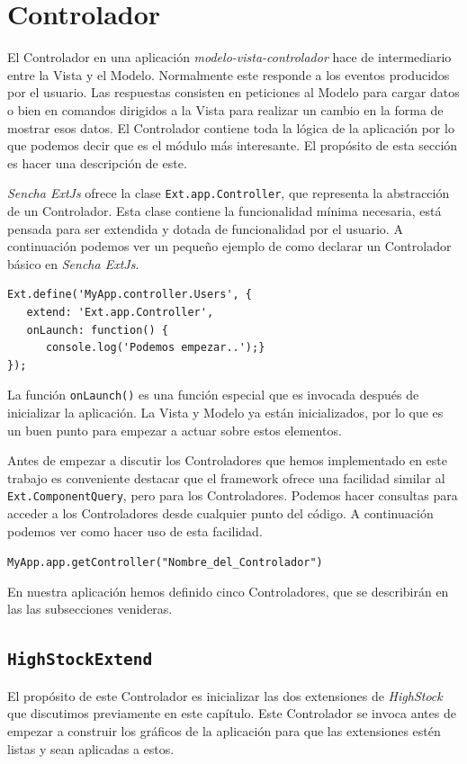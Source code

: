 \section{Controlador}
	El Controlador en una aplicación \emph{modelo-vista-controlador}\cite{MVCWiki} hace de intermediario entre la Vista y el Modelo. Normalmente
	este responde a los eventos producidos por el usuario. Las respuestas consisten en peticiones al Modelo para cargar datos o bien en comandos
	dirigidos a la Vista para realizar un cambio en la forma de mostrar esos datos. El Controlador contiene toda la lógica de la aplicación por lo
	que podemos decir que es el módulo más interesante. El propósito de esta sección es hacer una descripción de este.
	\par
	\emph{Sencha ExtJs} ofrece la clase \texttt{Ext.app.Controller}, que representa la abstracción de un Controlador. Esta clase contiene la
	funcionalidad mínima necesaria, está pensada para ser extendida y dotada de funcionalidad por el usuario. A continuación podemos ver un
	pequeño ejemplo de como declarar un Controlador básico en \emph{Sencha ExtJs}.
	\enlargethispage{-1\baselineskip}
	\begin{lstlisting}[style=myJs]
Ext.define('MyApp.controller.Users', {
   extend: 'Ext.app.Controller',
   onLaunch: function() {
      console.log('Podemos empezar..');}
});
	\end{lstlisting}
	\par
	La función \texttt{onLaunch()} es una función especial que es invocada después de inicializar la aplicación. La Vista y Modelo ya están
	inicializados, por lo que es un buen punto para empezar a actuar sobre estos elementos.
	\par
	Antes de empezar a discutir los Controladores que hemos implementado en este trabajo es conveniente destacar que el framework ofrece una
	facilidad similar al \texttt{Ext.ComponentQuery}, pero para los Controladores. Podemos hacer consultas para acceder a los Controladores desde
	cualquier punto del código. A continuación podemos ver como hacer uso de esta facilidad.
    		\begin{center} \texttt{MyApp.app.getController("Nombre\_del\_Controlador")}  \end{center}
	\par
	En nuestra aplicación hemos definido cinco Controladores, que se describirán en las las subsecciones venideras.
	\subsection{\texttt{HighStockExtend}}
		El propósito de este Controlador es inicializar las dos extensiones de \emph{HighStock} que discutimos previamente en este capítulo. Este
		Controlador se invoca antes de empezar a construir los gráficos de la aplicación para que las extensiones estén listas y sean
		aplicadas a estos.
